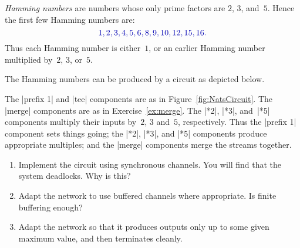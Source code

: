 \begin{question}
\emph{Hamming numbers} are numbers whose only prime factors are $2$, $3$,
and~$5$.  Hence the first few Hamming numbers are:
\[ \mstyle
1, 2, 3, 4, 5, 6, 8, 9, 10, 12, 15, 16.
\]
Thus each Hamming number is either~$1$, or an earlier Hamming number
multiplied by~$2$, $3$, or~$5$.

The Hamming numbers can be produced by a circuit as depicted below.
%
\begin{center}
\end{center}
%
The |prefix 1| and |tee| components are as in Figure~\ref{fig:NatsCircuit}.
The |merge| components are as in Exercise~\ref{ex:merge}.  The |*2|, |*3|,
and~|*5| components multiply their inputs by~$2$, $3$ and~$5$, respectively.
Thus the |prefix 1| component sets things going; the |*2|, |*3|, and |*5|
components produce appropriate multiples; and the |merge| components merge the
streams together.

\begin{enumerate}
\item Implement the circuit using synchronous channels.  You will find that
  the system deadlocks.  Why is this?

\item Adapt the network to use buffered channels where appropriate.  Is finite
  buffering enough?

\item Adapt the network so that it produces outputs only up to some given
  maximum value, and then terminates cleanly.
\end{enumerate}
\end{question}

